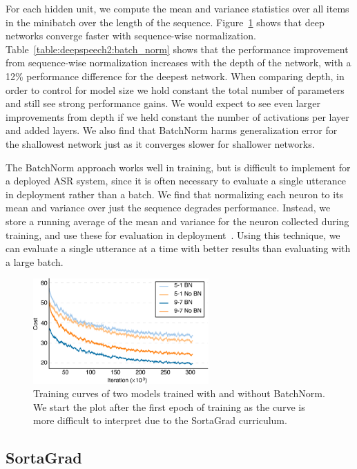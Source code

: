 For each hidden unit, we compute the mean and variance statistics over all
items in the minibatch over the length of the sequence.
Figure~\ref{fig:deepspeech2:bn} shows that deep networks converge faster with
sequence-wise normalization.  Table~\ref{table:deepspeech2:batch_norm} shows
that the performance improvement from sequence-wise normalization increases
with the depth of the network, with a 12\% performance difference for the
deepest network. When comparing depth, in order to control for model size we
hold constant the total number of parameters and still see strong performance
gains. We would expect to see even larger improvements from depth if we held
constant the number of activations per layer and added layers. We also find
that BatchNorm harms generalization error for the shallowest network just as it
converges slower for shallower networks. 

The BatchNorm approach works well in training, but is difficult to implement
for a deployed ASR system, since it is often necessary to evaluate a single
utterance in deployment rather than a batch. We find that normalizing each
neuron to its mean and variance over just the sequence degrades performance.
Instead, we store a running average of the mean and variance for the neuron
collected during training, and use these for evaluation in
deployment~\cite{ioffe2015batch}. Using this technique, we can evaluate a
single utterance at a time with better results than evaluating with a large
batch.

\begin{figure}
\centering
\includegraphics[width=0.6\textwidth]{deepspeech2/figures/bn_nobn.pdf}
\caption{Training curves of two models trained with and without BatchNorm. We
         start the plot after the first epoch of training as the curve is more
         difficult to interpret due to the SortaGrad curriculum.}
\label{fig:deepspeech2:bn}
\end{figure}

\subsection{SortaGrad}


